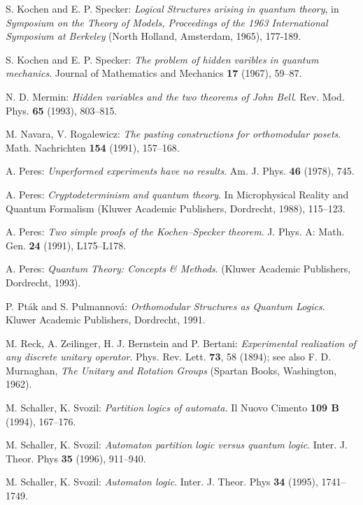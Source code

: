 \begin{thebibliography}{99}
S. Kochen and E. P. Specker:
{\em Logical Structures arising in quantum theory}, in
{\em Symposium on the Theory of Models, Proceedings of the
1963 International Symposium at Berkeley\/}
(North Holland, Amsterdam, 1965), 177-189.

S. Kochen and E. P. Specker:
{\em The problem of hidden varibles in quantum mechanics}.
Journal of Mathematics and Mechanics {\bf 17} (1967), 59--87.

N. D. Mermin:
{\em Hidden variables and the two theorems of John Bell}.
Rev. Mod. Phys. {\bf 65} (1993), 803--815.

 M. Navara, V. Rogalewicz:
{\it The pasting constructions for orthomodular posets}. Math. Nachrichten
{\bf 154} (1991), 157--168.

 A. Peres:
{\em Unperformed experiments have no results}. Am. J. Phys. {\bf 46} (1978),
745.

 A. Peres:
{\em Cryptodeterminism and quantum theory}. In Microphysical Reality and
Quantum Formalism (Kluwer Academic Publishers, Dordrecht, 1988), 115--123.

 A. Peres:
{\em Two simple proofs of the Kochen--Specker theorem}. J. Phys. A: Math.
Gen. {\bf 24} (1991), L175--L178.

 A. Peres:
{\em Quantum Theory: Concepts \& Methods}.
(Kluwer Academic Publishers, Dordrecht, 1993).

 P. Pt\'ak and S. Pulmannov\'a:
{\em Orthomodular Structures as Quantum Logics}.
Kluwer Academic Publishers, Dordrecht, 1991.

 M. Reck, A. Zeilinger, H. J. Bernstein and P. Bertani:
{\em Experimental realization of any discrete unitary operator}.
Phys. Rev. Lett. {\bf 73}, 58 (1894); see also
F. D. Murnaghan,
{\em The Unitary and Rotation Groups}
(Spartan Books, Washington, 1962).

 M. Schaller, K. Svozil:
{\it Partition logics of automata.} Il Nuovo Cimento {\bf 109 B} (1994),
167--176.

 M. Schaller, K. Svozil:
{\it Automaton partition logic versus quantum logic}.
Inter. J. Theor. Phys {\bf 35} (1996), 911--940.

 M. Schaller, K. Svozil:
{\it Automaton logic}. Inter. J. Theor. Phys
{\bf 34} (1995), 1741--1749.



\end{thebibliography}
